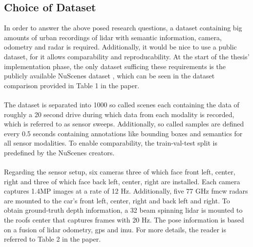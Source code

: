 \subsection{Choice of Dataset}
\label{subsec:choice_of_dataset}
In order to answer the above posed research questions, a dataset containing big amounts of urban recordings of lidar with semantic information, camera, odometry and radar is required. Additionally, it would be nice to use a public dataset, for it allows comparability and reproducability. At the start of the thesis' implementation phase, the only dataset sufficing these requirements is the publicly available NuScenes dataset \cite{caesar2020nuscenes}, which can be seen in the dataset comparison provided in Table 1 in the paper.
\\\\
The dataset is separated into 1000 so called scenes each containing the data of roughly a 20 second drive during which data from each modality is recorded, which is referred to as sensor sweeps. Additionally, so called samples are defined every 0.5 seconds containing annotations like bounding boxes and semantics for all sensor modalities. To enable comparability, the train-val-test split is predefined by the NuScenes creators.
\\\\
Regarding the sensor setup, six cameras three of which face front left, center, right and three of which face back left, center, right are installed. Each camera captures 1.4MP images at a rate of 12 Hz. Additionally, five 77 GHz \gls{fmcw} radars are mounted to the car's front left, center, right and back left and right. To obtain ground-truth depth information, a 32 beam spinning lidar is mounted to the roofs center that captures frames with 20 Hz. The pose information is based on a fusion of lidar odometry, \gls{gps} and \gls{imu}.  For more details, the reader is referred to Table 2 in the paper.
%

